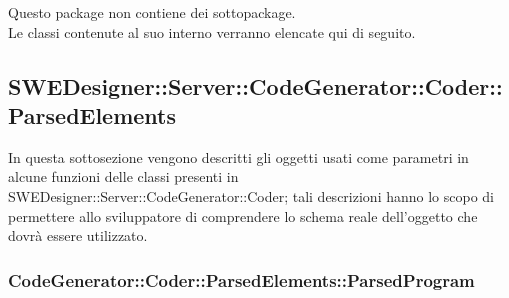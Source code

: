 \documentclass[../DefinizioneDiProdotto.tex]{subfiles}
\begin{document}
			Questo package non contiene dei sottopackage.\\
			Le classi contenute al suo interno verranno elencate qui di seguito.

			\subsection{SWEDesigner::Server::CodeGenerator::Coder::ParsedElements}
			In questa sottosezione vengono descritti gli oggetti usati come parametri in alcune funzioni delle classi presenti in SWEDesigner::Server::CodeGenerator::Coder; tali descrizioni hanno lo scopo di permettere allo sviluppatore di comprendere lo schema reale dell'oggetto che dovrà essere utilizzato.
			
			\subsubsection{CodeGenerator::Coder::ParsedElements::ParsedProgram}
			\hypertarget{SWEDesigner::Server::CodeGenerator::Coder::ParsedElements::ParsedProgram}{}
\end{document}
